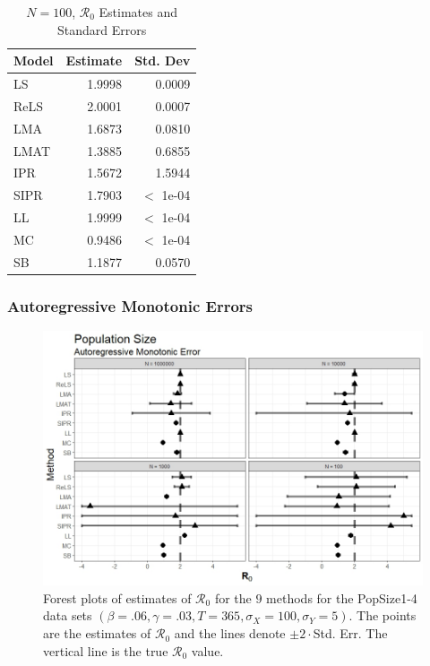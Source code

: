 \documentclass[12pt]{article}
\newcommand{\xxsir}{\ensuremath{9} } %
\newcommand{\rr}{\ensuremath{\mathcal{R}_0}}
\begin{document}
\begin{table}[H]
	
	\centering
	\begin{tabular}[t]{l|r|r}
		\hline
		Model & Estimate & Std. Dev\\
		\hline
		LS & 1.9998 & 0.0009\\
		\hline
		ReLS & 2.0001 & 0.0007\\
		\hline
		LMA & 1.6873 & 0.0810\\
		\hline
		LMAT & 1.3885 & 0.6855\\
		\hline
		IPR & 1.5672 & 1.5944\\
		\hline
		SIPR & 1.7903 & $<$ 1e-04\\
		\hline
		LL & 1.9999 & $<$ 1e-04\\
		\hline
		MC & 0.9486 & $<$ 1e-04\\
		\hline
		SB & 1.1877 & 0.0570\\
		\hline
	\end{tabular}
	\caption{$N = 100$, $\rr$ Estimates and Standard Errors}
\end{table}

\subsubsection{Autoregressive Monotonic Errors}

\begin{figure}[H]
	\centering
	\includegraphics[scale=0.5]{images/popsize_arm.jpeg}
	\caption{Forest plots of estimates of $\rr$ for the \xxsir methods for the PopSize1-4 data sets $(\beta=.06, \gamma=.03, T=365, \sigma_X=100, \sigma_Y=5)$.  The points are the estimates of $\rr$ and the lines denote $\pm 2\cdot $Std. Err.  The vertical line is the true $\rr$ value.}
\end{figure}
\end{document}

